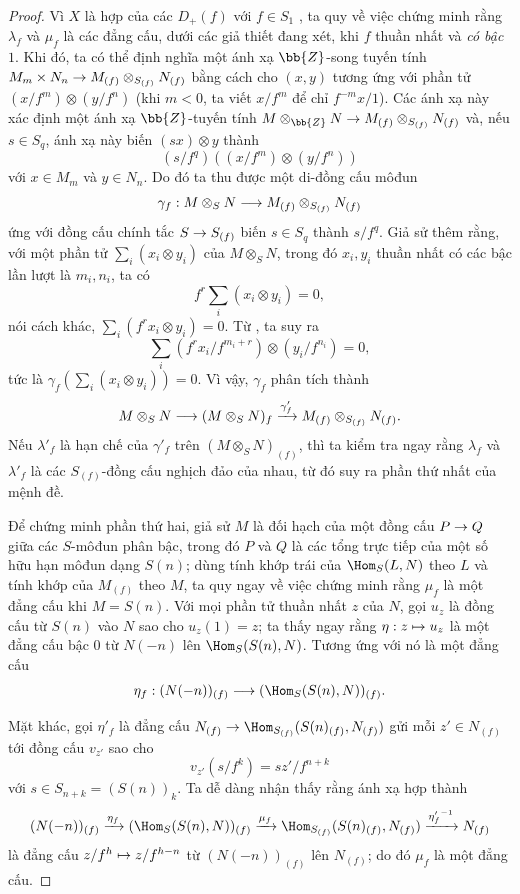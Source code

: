 \documentclass[oneside,10pt]{amsart}
\makeatletter
\newcommand{\ega@arrow}[2]{\mathchoice{#1}{#2}{#2}{#2}}
\let\ega@shortmapsto\mapsto
\renewcommand{\to}{\ega@arrow{\longrightarrow}{\rightarrow}}
\renewcommand{\mapsto}{\ega@arrow{\longmapsto}{\ega@shortmapsto}}
\newcommand{\oldpage}[2][]{\marginnote{\normalfont\footnotesize\textbf{#1}~|~#2}\ignorespaces}
\makeatother
\begin{document}
\begin{proof}
Vì $X$ là hợp của các $D_+(f)$ với $f\in S_1$ , ta quy về việc chứng minh rằng $\lambda_f$ và $\mu_f$ là các đẳng cấu, dưới các giả thiết đang xét, khi $f$ thuần nhất và \emph{có bậc $1$}.
Khi đó, ta có thể định nghĩa một ánh xạ $\bb{Z}$-song tuyến tính $M_m\times N_n\to M_{(f)}\otimes_{S_{(f)}}N_{(f)}$ bằng cách cho $(x,y)$ tương ứng với phần tử $(x/f^m)\otimes(y/f^n)$ (khi $m<0$, ta viết $x/f^m$ để chỉ $f^{-m}x/1$).
Các ánh xạ này xác định một ánh xạ $\bb{Z}$-tuyến tính $M\otimes_{\bb{Z}}N\to M_{(f)}\otimes_{S_{(f)}}N_{(f)}$ và, nếu $s\in S_q$, ánh xạ này biến $(sx)\otimes y$ thành
\[
  (s/f^q)((x/f^m)\otimes(y/f^n))
\]
với $x\in M_m$ và $y\in N_n$.
Do đó ta thu được một di-đồng cấu môđun
\[
  \gamma_f:M\otimes_S N\to M_{(f)}\otimes_{S_{(f)}}N_{(f)}
\]
ứng với đồng cấu chính tắc $S\to S_{(f)}$ biến $s\in S_q$ thành $s/f^q$.
Giả sử thêm rằng, với một phần tử $\sum_i(x_i\otimes y_i)$ của $M\otimes_S N$, trong đó $x_i,y_i$ thuần nhất có các bậc lần lượt là $m_i,n_i$, ta có
\[
  f^r\sum_i(x_i\otimes y_i)=0,
\]
nói cách khác, $\sum_i(f^rx_i\otimes y_i)=0$.
Từ , ta suy ra
\[
  \sum_i(f^rx_i/f^{m_i+r})\otimes(y_i/f^{n_i})=0,
\]
tức là $\gamma_f(\sum_i(x_i\otimes y_i))=0$.
Vì vậy, $\gamma_f$ phân tích thành
\[
  M\otimes_S N\to(M\otimes_S N)_f
  \xrightarrow{\gamma'_f}M_{(f)}\otimes_{S_{(f)}}N_{(f)}.
\]
Nếu $\lambda'_f$ là hạn chế của $\gamma'_f$
\oldpage[II]{35}
trên $(M\otimes_S N)_{(f)}$, thì ta kiểm tra ngay rằng $\lambda_f$ và $\lambda'_f$ là các $S_{(f)}$-đồng cấu nghịch đảo của nhau, từ đó suy ra phần thứ nhất của mệnh đề.

Để chứng minh phần thứ hai, giả sử $M$ là đối hạch của một đồng cấu $P\to Q$ giữa các $S$-môđun phân bậc, trong đó $P$ và $Q$ là các tổng trực tiếp của một số hữu hạn môđun dạng $S(n)$; dùng tính khớp trái của $\Hom_S(L,N)$ theo $L$ và tính khớp của $M_{(f)}$ theo $M$, ta quy ngay về việc chứng minh rằng $\mu_f$ là một đẳng cấu khi $M=S(n)$.
Với mọi phần tử thuần nhất $z$ của $N$, gọi $u_z$ là đồng cấu từ $S(n)$ vào $N$ sao cho $u_z(1)=z$; ta thấy ngay rằng $\eta:z\mapsto u_z$ là một đẳng cấu bậc $0$ từ $N(-n)$ lên $\Hom_S(S(n),N)$.
Tương ứng với nó là một đẳng cấu
\[
  \eta_f:(N(-n))_{(f)}\to(\Hom_S(S(n),N))_{(f)}.
\]

Mặt khác, gọi $\eta'_f$ là đẳng cấu $N_{(f)}\to\Hom_{S_{(f)}}(S(n)_{(f)},N_{(f)})$ gửi mỗi $z'\in N_{(f)}$ tới đồng cấu $v_{z'}$ sao cho
\[
  v_{z'}(s/f^k)=sz'/f^{n+k}
\]
với $s\in S_{n+k}=(S(n))_k$.
Ta dễ dàng nhận thấy rằng ánh xạ hợp thành
\[
  (N(-n))_{(f)}
  \xrightarrow{\eta_f}(\Hom_S(S(n),N))_{(f)}
  \xrightarrow{\mu_f}\Hom_{S_{(f)}}(S(n)_{(f)},N_{(f)})
  \xrightarrow{{\eta'_f}^{-1}}N_{(f)}
\]
là đẳng cấu $z/f^h\mapsto z/f^{h-n}$ từ $(N(-n))_{(f)}$ lên $N_{(f)}$; do đó $\mu_f$ là một đẳng cấu.
\end{proof}
\end{document}
